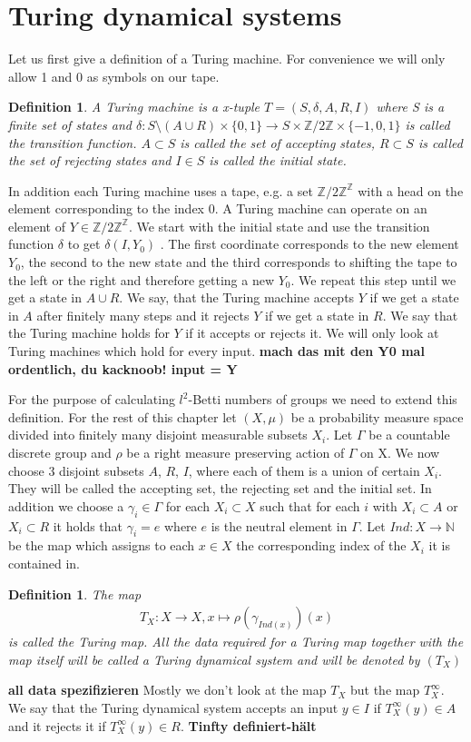 \documentclass[12pt,a4paper]{scrartcl}
\newtheorem{Definition}[Theorem]{Definition}
\numberwithin{equation}{section}
\newcommand{\Z}{\mathbb{Z}} %
\newcommand{\N}{\mathbb{N}} %
\newcommand{\2}{\mathbb{Z} / 2 \mathbb{Z}}
\newcommand{\1}{\overline{1}}
\newcommand{\0}{\overline{0}}
\begin{document}
\section{Turing dynamical systems}
Let us first give a definition of a Turing machine. For convenience we will only allow 1 and 0 as symbols on our tape.
\begin{Definition}
	A Turing machine is a x-tuple $T=(S,\delta, A, R, I)$ where S is a finite set of states and $\delta: S \setminus(A \cup R) \times \{0,1\} \to S \times \2 \times \{-1, 0, 1\}$ is called the transition function. $A \subset S$ is called the set of accepting states, $R \subset S$ is called the set of rejecting states and $I \in S$ is called the initial state.
\end{Definition}
In addition each Turing machine uses a tape, e.g. a set $\Z / 2\Z ^{\Z}$ with a head on the element corresponding to the index 0. A Turing machine can operate on an element of $Y \in \Z / 2\Z ^{\Z}$. We start with the initial state and use the transition function $\delta$ to get $\delta(I, Y_0)$ . The first coordinate corresponds to the new element $Y_0$, the second to the new state and the third corresponds to shifting the tape to the left or the right and therefore getting a new $Y_0$. We repeat this step until we get a state in $A \cup R$. We say, that the Turing machine accepts $Y$ if we get a state in $A$ after finitely many steps and it rejects $Y$ if we get a state in $R$. We say that the Turing machine holds for $Y$ if it accepts or rejects it. We will only look at Turing machines which hold for every input.
\textbf{mach das mit den Y0 mal ordentlich, du kacknoob! input = Y}

For the purpose of calculating $l^2$-Betti numbers of groups we need to extend this definition. For the rest of this chapter let $(X, \mu)$ be a probability measure space divided into finitely many disjoint measurable subsets $X_i$. Let $\Gamma$ be a countable discrete group and $\rho$ be a right measure preserving action of $\Gamma$ on X.
We now choose 3 disjoint subsets $A$, $R$, $I$, where each of them is a union of certain $X_i$. They will be called the accepting set, the rejecting set and the initial set. In addition we choose a $\gamma_i \in \Gamma$ for each $X_i \subset X$ such that for each $i$ with $X_i \subset A$ or $X_i \subset R$ it holds that $\gamma_i = e$ where $e$ is the neutral element in $\Gamma$. 
Let $Ind: X \to \N$ be the map which assigns to each $x \in X$ the corresponding index of the $X_i$ it is contained in.
\begin{Definition}
	 The map 
	 \begin{align*}
	 T_X:X \to X, x \mapsto \rho(\gamma_{Ind(x)})(x)
	 \end{align*}
	 is called the Turing map.
	 All the data required for a Turing map together with the map itself will be called a Turing dynamical system and will be denoted by $(T_X)$
\end{Definition}
\textbf{all data spezifizieren}
Mostly we don't look at the map $T_X$ but the map $T_X^\infty$. We say that the Turing dynamical system accepts an input $y \in I$ if $T_X^\infty(y) \in A$ and it rejects it if $T_X^\infty(y) \in R$. \textbf{Tinfty definiert-hält}
\end{document}
